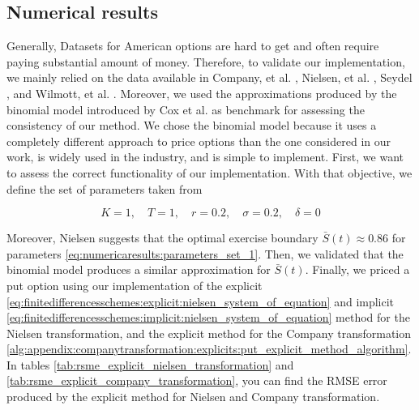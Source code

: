 \subsection{Numerical results}
Generally, Datasets for American options are hard to get and often require paying substantial amount of money. Therefore, to validate our implementation, we mainly relied on the data available in Company, 
et al. \cite*{company_egorova_jodar_2014}, Nielsen, et al. \cite*{nielsen_2001}, Seydel \cite*{seydel_2009}, and Wilmott, et al. \cite*{wilmott_howison_dewynne_1995}. Moreover, we used the approximations produced by the binomial model introduced by Cox et al. \cite{cox_1979} as benchmark for assessing the consistency of our method. We chose the binomial model because it uses a completely different approach to price options than the one considered in our work, is widely used in the industry, and is simple to implement. First, 
we want to assess the correct functionality of our implementation. With that objective, we define the set of parameters taken from \cite{nielsen_2001}

\begin{equation}
  \label{eq:numericaresults:parameters_set_1}
  K = 1, \quad T = 1, \quad r=0.2, \quad \sigma=0.2, \quad \delta = 0 
\end{equation}

Moreover, Nielsen \cite{nielsen_2001} suggests that the optimal exercise boundary $\bar{S}(t) \approx 0.86$ for parameters \eqref{eq:numericaresults:parameters_set_1}. Then, we validated that the binomial model produces a similar approximation for $\bar{S}(t)$. Finally, we priced a put option using our implementation of the explicit \eqref{eq:finitedifferencesschemes:explicit:nielsen_system_of_equation} and implicit \eqref{eq:finitedifferencesschemes:implicit:nielsen_system_of_equation} method for the Nielsen transformation, and the explicit method for the Company transformation \eqref{alg:appendix:companytransformation:explicits:put_explicit_method_algorithm}. In tables \eqref{tab:rsme_explicit_nielsen_transformation} and \eqref{tab:rsme_explicit_company_transformation}, you can find the RMSE error produced by the explicit method for Nielsen and Company transformation.

